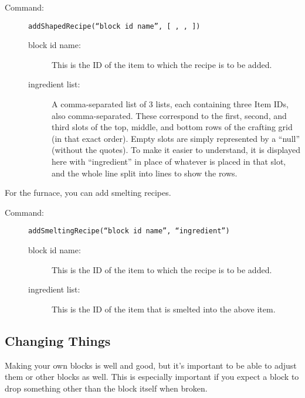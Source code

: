 \documentclass[letterpaper,titlepage,12pt]{article}
\begin{document}
\begin{description}
\item[Command:] \texttt{addShapedRecipe(``block id name'', [ , , ])}
\begin{description}
\item [block id name:] This is the ID of the item to which the recipe is to be added.
\item [ingredient list:] A comma-separated list of 3 lists, each containing three Item IDs, also comma-separated.  These correspond to the first, second, and third slots of the top, middle, and bottom rows of the crafting grid (in that exact order).  Empty slots are simply represented by a ``null'' (without the quotes).  To make it easier to understand, it is displayed here with ``ingredient'' in place of whatever is placed in that slot, and the whole line split into lines to show the rows.
\end{description}
\end{description}

\newpage

For the furnace, you can add smelting recipes.

\begin{description}
\item[Command:] \texttt{addSmeltingRecipe(``block id name'', ``ingredient'')}
\begin{description}
\item [block id name:] This is the ID of the item to which the recipe is to be added.
\item [ingredient list:] This is the ID of the item that is smelted into the above item.
\end{description}
\end{description}

\subsection{Changing Things}

Making your own blocks is well and good, but it's important to be able to adjust them or other blocks as well.  This is especially important if you expect a block to drop something other than the block itself when broken.
\end{document}

